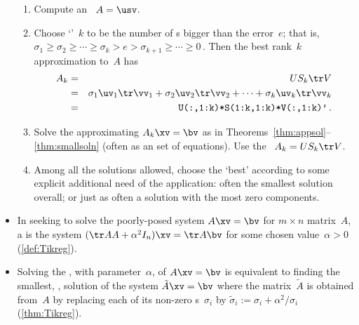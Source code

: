 \begin{itemize}
\begin{enumerate}
\item Compute an \svd\ \(A=\usv\).

\item Choose `'~\(k\) to be the number of s bigger than the error~\(e\); that is, \(\sigma_1\geq \sigma_2\geq\cdots \geq \sigma_k>e>\sigma_{k+1}\geq \cdots\geq 0\)\,.
Then the best rank~\(k\) approximation to~\(A\) has \svd
\begin{eqnarray*}
A_k&=&US_k\tr V
\\&=&\sigma_1\uv_1\tr\vv_1+\sigma_2\uv_2\tr\vv_2+\cdots+\sigma_k\uv_k\tr\vv_k
\\&=&\verb|U(:,1:k)*S(1:k,1:k)*V(:,1:k)'|\,.
\end{eqnarray*}

\item Solve the approximating  \(A_k\xv=\bv\) as in Theorems~\ref{thm:appsol}--\ref{thm:smallsoln} (often as an  set of equations).
Use the \svd\ \(A_k=US_k\tr V\).

\item Among all the solutions allowed, choose the `best' according to some explicit additional need of the application: often the smallest solution overall; or just as often a solution with the most zero components.
\end{enumerate}


\item In seeking to solve the poorly-posed system \(A\xv=\bv\) for \(m\times n\) matrix~\(A\), 
a  is the system \((\tr AA+\alpha^2I_n)\xv=\tr A\bv\) for some chosen  value~\(\alpha>0\) (\autoref{def:Tikreg}).

\item Solving the , with parameter~\(\alpha\), of \(A\xv=\bv\) is equivalent to finding the smallest, , solution of the system \(\tilde A\xv=\bv\) where  
the matrix~\(\tilde A\) is obtained from~\(A\) by replacing each of its non-zero s~\(\sigma_i\) by \(\tilde\sigma_i:=\sigma_i+\alpha^2/\sigma_i\) (\autoref{thm:Tikreg}).



\end{itemize}



\makeanswers
